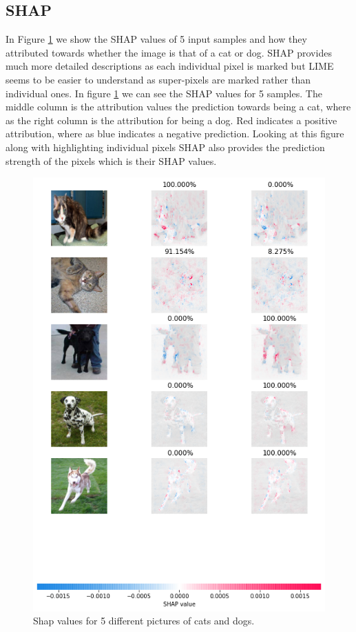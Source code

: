 \subsection{SHAP}
In Figure \ref{fig:shap-cat} we show the SHAP values of 5 input samples and how they attributed towards whether the image is that of a cat or dog. SHAP provides much more detailed descriptions as each individual pixel is marked but LIME seems to be easier to understand as super-pixels are marked rather than individual ones. In figure \ref{fig:shap-cat} we can see the SHAP values for 5 samples. The middle column is the attribution values the prediction towards being a cat, where as the right column is the attribution for being a dog. Red indicates a positive attribution, where as blue indicates a negative prediction. Looking at this figure along with highlighting individual pixels SHAP also provides the prediction strength of the pixels which is their SHAP values.
\begin  {figure}[!htpb]
  \includegraphics[width=\linewidth]{Evaluation_Images/CATS_DOGS_SHAP.png}
  \caption{Shap values for 5 different pictures of cats and dogs.}
  \label{fig:shap-cat}
\end{figure}

